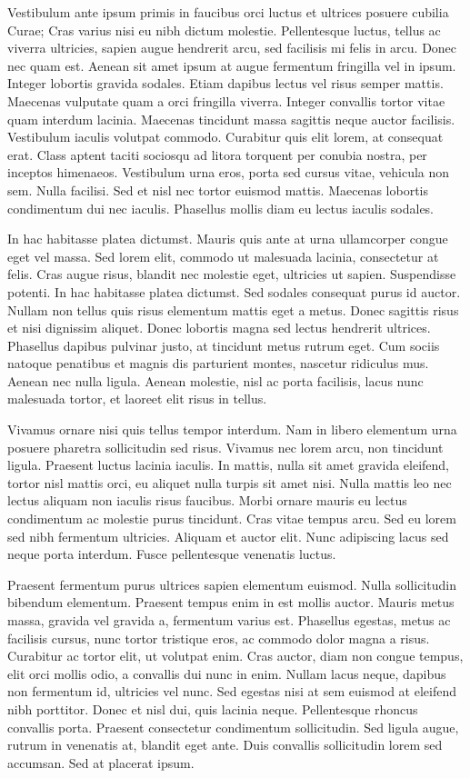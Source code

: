 \documentclass{book}
\begin{document}
Vestibulum ante ipsum primis in faucibus orci luctus et ultrices posuere cubilia
Curae; Cras varius nisi eu nibh dictum molestie. Pellentesque luctus, tellus ac
viverra ultricies, sapien augue hendrerit arcu, sed facilisis mi felis in arcu.
Donec nec quam est. Aenean sit amet ipsum at augue fermentum fringilla vel in
ipsum. Integer lobortis gravida sodales. Etiam dapibus lectus vel risus semper
mattis. Maecenas vulputate quam a orci fringilla viverra. Integer convallis
tortor vitae quam interdum lacinia. Maecenas tincidunt massa sagittis neque
auctor facilisis. Vestibulum iaculis volutpat commodo. Curabitur quis elit lorem,
at consequat erat. Class aptent taciti sociosqu ad litora torquent per conubia
nostra, per inceptos himenaeos. Vestibulum urna eros, porta sed cursus vitae,
vehicula non sem. Nulla facilisi. Sed et nisl nec tortor euismod mattis.
Maecenas lobortis condimentum dui nec iaculis. Phasellus mollis diam eu lectus
iaculis sodales.


In hac habitasse platea dictumst. Mauris quis ante at urna ullamcorper congue
eget vel massa. Sed lorem elit, commodo ut malesuada lacinia, consectetur at
felis. Cras augue risus, blandit nec molestie eget, ultricies ut sapien.
Suspendisse potenti. In hac habitasse platea dictumst. Sed sodales consequat
purus id auctor. Nullam non tellus quis risus elementum mattis eget a metus.
Donec sagittis risus et nisi dignissim aliquet. Donec lobortis magna sed lectus
hendrerit ultrices. Phasellus dapibus pulvinar justo, at tincidunt metus rutrum
eget. Cum sociis natoque penatibus et magnis dis parturient montes, nascetur
ridiculus mus. Aenean nec nulla ligula. Aenean molestie, nisl ac porta
facilisis, lacus nunc malesuada tortor, et laoreet elit risus in tellus.


Vivamus ornare nisi quis tellus tempor interdum. Nam in libero elementum urna
posuere pharetra sollicitudin sed risus. Vivamus nec lorem arcu, non tincidunt
ligula. Praesent luctus lacinia iaculis. In mattis, nulla sit amet gravida
eleifend, tortor nisl mattis orci, eu aliquet nulla turpis sit amet nisi.
Nulla mattis leo nec lectus aliquam non iaculis risus faucibus. Morbi ornare
mauris eu lectus condimentum ac molestie purus tincidunt. Cras vitae tempus
arcu. Sed eu lorem sed nibh fermentum ultricies. Aliquam et auctor elit. Nunc
adipiscing lacus sed neque porta interdum. Fusce pellentesque venenatis luctus.


Praesent fermentum purus ultrices sapien elementum euismod. Nulla sollicitudin
bibendum elementum. Praesent tempus enim in est mollis auctor. Mauris metus
massa, gravida vel gravida a, fermentum varius est. Phasellus egestas, metus ac
facilisis cursus, nunc tortor tristique eros, ac commodo dolor magna a risus.
Curabitur ac tortor elit, ut volutpat enim. Cras auctor, diam non congue tempus,
elit orci mollis odio, a convallis dui nunc in enim. Nullam lacus neque, dapibus
non fermentum id, ultricies vel nunc. Sed egestas nisi at sem euismod at
eleifend nibh porttitor. Donec et nisl dui, quis lacinia neque. Pellentesque
rhoncus convallis porta. Praesent consectetur condimentum sollicitudin. Sed
ligula augue, rutrum in venenatis at, blandit eget ante. Duis convallis
sollicitudin lorem sed accumsan. Sed at placerat ipsum.



\newpage
\renewcommand{\cftchapdotsep}{\cftdotsep}
\tableofcontents
\end{document}
